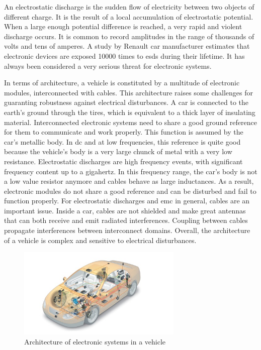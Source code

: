 An electrostatic discharge is the sudden flow of electricity between two objects of different charge.
It is the result of a local accumulation of electrostatic potential.
When a large enough potential difference is reached, a very rapid and violent discharge occurs.
It is common to record amplitudes in the range of thousands of volts and tens of amperes.
A study by Renault car manufacturer \cite{Renault-esd} estimates that electronic devices are exposed 10000 times to \gls{esd}s during their lifetime.
It has always been considered a very serious threat for electronic systems.

In terms of architecture, a vehicle is constituted by a multitude of electronic modules, interconnected with cables.
This architecture raises some challenges for guaranting robustness against electrical disturbances.
A car is connected to the earth's ground through the tires, which is equivalent to a thick layer of insulating material.
Interconnected electronic systems need to share a good ground reference for them to communicate and work properly.
This function is assumed by the car's metallic body.
In \gls{dc} and at low frequencies, this reference is quite good because the vehicle's body is a very large chunck of metal with a very low resistance.
Electrostatic discharges are high frequency events, with significant frequency content up to a gigahertz.
In this frequency range, the car's body is not a low value resistor anymore and cables behave as large inductances.
As a result, electronic modules do not share a good reference and can be disturbed and fail to function properly.
For electrostatic discharges and \gls{emc} in general, cables are an important issue.
Inside a car, cables are not shielded and make great antennas that can both receive and emit radiated interferences.
Coupling between cables propagate interferences between interconnect domains.
Overall, the architecture of a vehicle is complex and sensitive to electrical disturbances.

\begin{figure}[!h]
  \centering
  \includegraphics[width=0.7\textwidth]{src/1/figures/systemintegration_01_uv-data.jpg}
  \caption{Architecture of electronic systems in a vehicle \cite{car-architecture}}
  \label{fig:car-architecture}
\end{figure}

